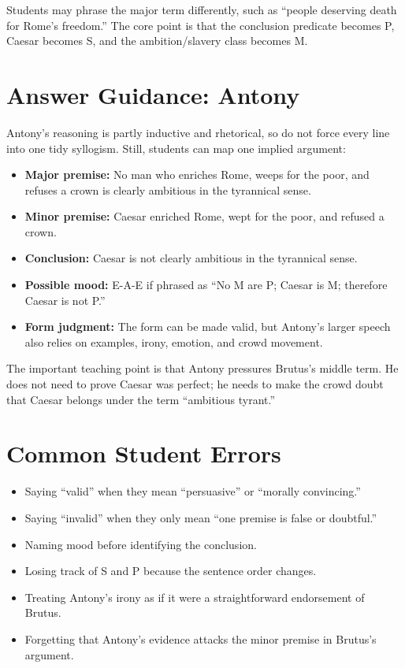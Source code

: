\documentclass[12pt]{article}
\begin{document}
Students may phrase the major term differently, such as ``people deserving death for Rome's freedom.'' The core point is that the conclusion predicate becomes P, Caesar becomes S, and the ambition/slavery class becomes M.

\section*{Answer Guidance: Antony}
Antony's reasoning is partly inductive and rhetorical, so do not force every line into one tidy syllogism. Still, students can map one implied argument:
\begin{itemize}[leftmargin=*]
\item \textbf{Major premise:} No man who enriches Rome, weeps for the poor, and refuses a crown is clearly ambitious in the tyrannical sense.
\item \textbf{Minor premise:} Caesar enriched Rome, wept for the poor, and refused a crown.
\item \textbf{Conclusion:} Caesar is not clearly ambitious in the tyrannical sense.
\item \textbf{Possible mood:} E-A-E if phrased as ``No M are P; Caesar is M; therefore Caesar is not P.''
\item \textbf{Form judgment:} The form can be made valid, but Antony's larger speech also relies on examples, irony, emotion, and crowd movement.
\end{itemize}

The important teaching point is that Antony pressures Brutus's middle term. He does not need to prove Caesar was perfect; he needs to make the crowd doubt that Caesar belongs under the term ``ambitious tyrant.''

\section*{Common Student Errors}
\begin{itemize}[leftmargin=*]
\item Saying ``valid'' when they mean ``persuasive'' or ``morally convincing.''
\item Saying ``invalid'' when they only mean ``one premise is false or doubtful.''
\item Naming mood before identifying the conclusion.
\item Losing track of S and P because the sentence order changes.
\item Treating Antony's irony as if it were a straightforward endorsement of Brutus.
\item Forgetting that Antony's evidence attacks the minor premise in Brutus's argument.
\end{itemize}
\end{document}
